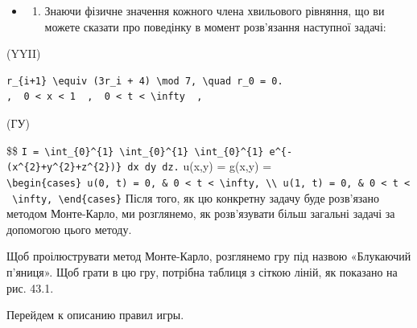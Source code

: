 \documentclass[
  ukrainian,
]{article}
\providecommand{\tightlist}{%
  \setlength{\itemsep}{0pt}\setlength{\parskip}{0pt}}
\begin{document}
\begin{itemize}
\tightlist
\item
  \begin{enumerate}
  \def\labelenumi{\arabic{enumi}.}
  \setcounter{enumi}{1}
  \tightlist
  \item
    Знаючи фізичне значення кожного члена хвильового рівняння, що ви
    можете сказати про поведінку в момент розв'язання наступної задачі:
  \end{enumerate}
\end{itemize}

(YYII)

\begin{verbatim}
r_{i+1} \equiv (3r_i + 4) \mod 7, \quad r_0 = 0.
,  0 < x < 1  ,  0 < t < \infty  ,
\end{verbatim}

(ГУ)

\$\$
\texttt{I\ =\ \textbackslash{}int\_\{0\}\^{}\{1\}\ \textbackslash{}int\_\{0\}\^{}\{1\}\ \textbackslash{}int\_\{0\}\^{}\{1\}\ e\^{}\{-(x\^{}\{2\}+y\^{}\{2\}+z\^{}\{2\})\}\ dx\ dy\ dz.}
u(x,y) = g(x,y) =
\texttt{\textbackslash{}begin\{cases\}\ u(0,\ t)\ =\ 0,\ \&\ 0\ \textless{}\ t\ \textless{}\ \textbackslash{}infty,\ \textbackslash{}\textbackslash{}\ u(1,\ t)\ =\ 0,\ \&\ 0\ \textless{}\ t\ \textless{}\ \textbackslash{}infty,\ \textbackslash{}end\{cases\}}
Після того, як цю конкретну задачу буде розв'язано методом Монте-Карло,
ми розглянемо, як розв'язувати більш загальні задачі за допомогою цього
методу.

Щоб проілюструвати метод Монте-Карло, розглянемо гру під назвою
«Блукаючий п'яниця». Щоб грати в цю гру, потрібна таблиця з сіткою
ліній, як показано на рис. 43.1.

Перейдем к описанию правил игры.
\end{document}
